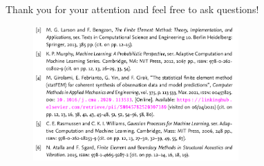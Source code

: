\documentclass[fleqn,11pt,aspectratio=43]{beamer}
\begin{document}
\begin{frame}[plain]
  Thank you for your attention and feel free to ask questions!\\
  
  \begin{figure}

\includegraphics[width=0.7\textwidth]{refs.png}

\end{figure}

\end{frame}
\end{document}
